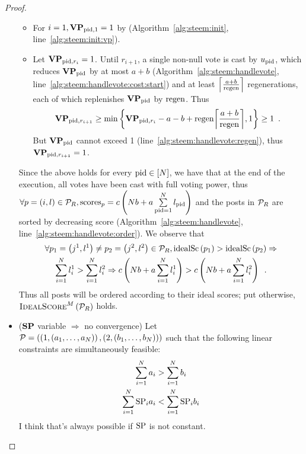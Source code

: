 \begin{proof}
\begin{itemize}
    \begin{itemize}
      \item For $i = 1, \votpowvec_{\pid, 1} = 1$ by
      (Algorithm~\ref{alg:steem:init}, line~\ref{alg:steem:init:vp}).  \item Let
      $\votpowvec_{\pid, r_i} = 1$. Until $r_{i + 1}$, a single non-null vote is
      cast by $u_\pid$, which reduces $\votpowvec_{\pid}$ by at most $a + b$
      (Algorithm~\ref{alg:steem:handlevote},
      line~\ref{alg:steem:handlevote:cost:start}) and at least $\ceil*{\frac{a +
      b}{\regen}}$ regenerations, each of which replenishes $\votpowvec_{\pid}$
      by $\regen$. Thus
      \begin{equation*}
        \votpowvec_{\pid, r_{i + 1}} \geq \min{\left\{\votpowvec_{\pid, r_i} - a
        - b + \regen\ceil*{\frac{a + b}{\regen}}, 1\right\}} \geq 1 \enspace.
      \end{equation*}
      But $\votpowvec_{\pid}$ cannot exceed 1
      (line~\ref{alg:steem:handlevote:regen}), thus $\votpowvec_{\pid, r_{i +
      1}} = 1$.
    \end{itemize}
    Since the above holds for every $\pid \in \left[\playerlen\right]$, we have
    that at the end of the execution, all votes have been cast with full voting
    power, thus $\forall \post = \left(i, \like\right) \in \postlist_\rounds,
    \mathrm{scores}_{p} = c\left(\playerlen b + a \sum\limits_{\pid =
    1}^\playerlen \like_{\pid}\right)$ and the posts in $\postlist_R$ are sorted
    by decreasing score (Algorithm~\ref{alg:steem:handlevote},
    line~\ref{alg:steem:handlevote:order}). We observe that
    \begin{gather*}
      \forall p_1 = \left(j^1, \like^1\right) \neq p_2 = \left(j^2,
      \like^2\right) \in \postlist_R, \idsc{p_1} > \idsc{p_2} \Rightarrow \\
      \sum\limits_{i = 1}^\playerlen \like^1_i > \sum\limits_{i = 1}^\playerlen
      \like^2_i \Rightarrow c\left(\playerlen b + a \sum\limits_{i =
      1}^\playerlen \like^1_i\right) > c\left(\playerlen b + a \sum\limits_{i =
      1}^\playerlen \like^2_i\right) \enspace.
    \end{gather*}
    Thus all posts will be ordered according to their ideal scores; put
    otherwise, $\textsc{IdealScore}^M\left(\postlist_\rounds\right)$ holds.

    \item ($\stpowvec$ variable $\Rightarrow$ no convergence) Let $\postlist =
    \left(\left(1, \left(a_1, \dots, a_\playerlen\right)\right), \left(2,
    \left(b_1, \dots, b_\playerlen\right)\right)\right)$ such that the following
    linear constraints are simultaneously feasible:
    \begin{gather*}
      \sum\limits_{i=1}^\playerlen a_i > \sum\limits_{i=1}^\playerlen b_i \\
      \sum\limits_{i=1}^\playerlen \stpow_i a_i < \sum\limits_{i=1}^\playerlen
      \stpow_i  b_i
    \end{gather*}
    I think that's always possible if $\stpow$ is not constant.


\end{itemize}
\end{proof}
